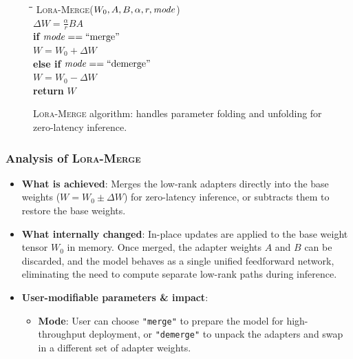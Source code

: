\newpage

\begin{figure}[h]
\centering
\begin{minipage}{0.8\linewidth}
\begin{tabbing}
\quad \= \quad \= \quad \= \kill
\textsc{Lora-Merge}($W_0, A, B, \alpha, r, \text{\textit{mode}}$) \\
\> $\Delta W = \frac{\alpha}{r} B A$ \\
\> \textbf{if} $\text{\textit{mode}} == \text{``merge''}$ \\
\> \> $W = W_0 + \Delta W$ \\
\> \textbf{else if} $\text{\textit{mode}} == \text{``demerge''}$ \\
\> \> $W = W_0 - \Delta W$ \\
\> \textbf{return} $W$
\end{tabbing}
\end{minipage}
\caption{\textsc{Lora-Merge} algorithm: handles parameter folding and unfolding for zero-latency inference.}
\end{figure}

\subsubsection{Analysis of \textsc{Lora-Merge}}
\begin{itemize}
  \item \textbf{What is achieved}: Merges the low-rank adapters directly into the base weights ($W = W_0 \pm \Delta W$) for zero-latency inference, or subtracts them to restore the base weights.
  \item \textbf{What internally changed}: In-place updates are applied to the base weight tensor $W_0$ in memory. Once merged, the adapter weights $A$ and $B$ can be discarded, and the model behaves as a single unified feedforward network, eliminating the need to compute separate low-rank paths during inference.
  \item \textbf{User-modifiable parameters \& impact}:
    \begin{itemize}
      \item \textbf{Mode}: User can choose \texttt{"merge"} to prepare the model for high-throughput deployment, or \texttt{"demerge"} to unpack the adapters and swap in a different set of adapter weights.
    \end{itemize}
\end{itemize}

\vspace{1.5em}

